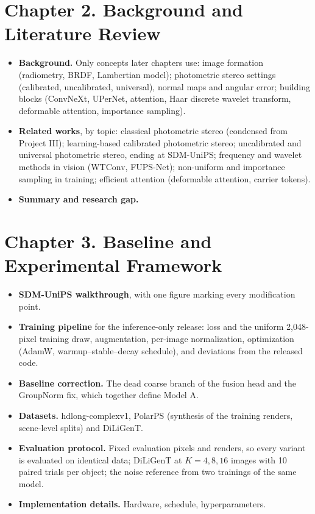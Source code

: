 \documentclass[Main.tex]{subfiles}
\begin{document}
\section*{Chapter 2. Background and Literature Review }
\begin{itemize}
  \item[2.1] \textbf{Background.} Only concepts later chapters use: image formation (radiometry,
    BRDF, Lambertian model); photometric stereo settings (calibrated, uncalibrated, universal),
    normal maps and angular error; building blocks (ConvNeXt, UPerNet, attention, Haar discrete
    wavelet transform, deformable attention, importance sampling).
  \item[2.2] \textbf{Related works}, by topic: classical photometric stereo (condensed from
    Project III); learning-based calibrated photometric stereo; uncalibrated and universal
    photometric stereo, ending at SDM-UniPS; frequency and wavelet methods in vision (WTConv,
    FUPS-Net); non-uniform and importance sampling in training; efficient attention (deformable
    attention, carrier tokens).
  \item[2.3] \textbf{Summary and research gap.}
\end{itemize}

\section*{Chapter 3. Baseline and Experimental Framework}
\begin{itemize}
  \item[3.1] \textbf{SDM-UniPS walkthrough}, with one figure marking every modification point.
  \item[3.2] \textbf{Training pipeline} for the inference-only release: loss and the uniform
    2,048-pixel training draw, augmentation, per-image normalization, optimization (AdamW,
    warmup--stable--decay schedule), and deviations from the released code.
  \item[3.3] \textbf{Baseline correction.} The dead coarse branch of the fusion head and the
    GroupNorm fix, which together define Model A.
  \item[3.4] \textbf{Datasets.} hdlong-complexv1, PolarPS (synthesis of the training renders,
    scene-level splits) and DiLiGenT.
  \item[3.5] \textbf{Evaluation protocol.} Fixed evaluation pixels and renders, so every variant is
    evaluated on identical data; DiLiGenT at $K = 4, 8, 16$ images with 10 paired trials per
    object; the noise reference from two trainings of the same model.
  \item[3.6] \textbf{Implementation details.} Hardware, schedule, hyperparameters.
\end{itemize}
\end{document}

